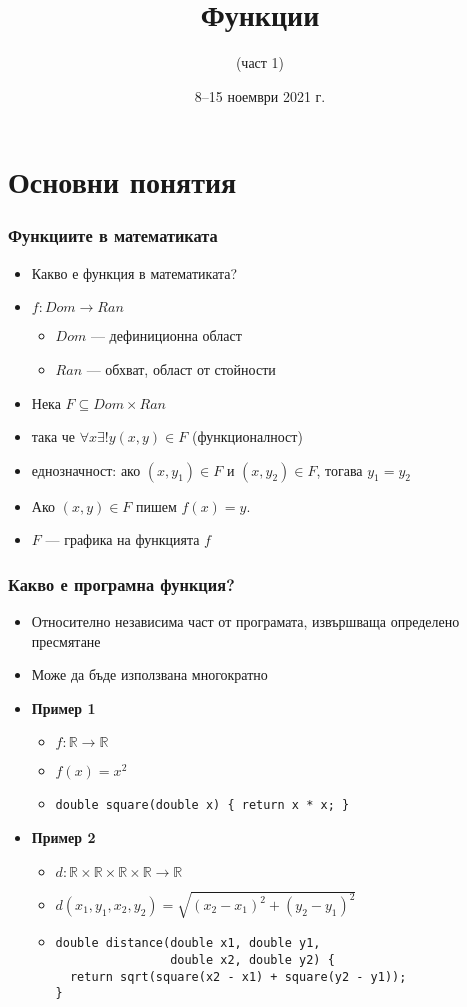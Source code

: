 \documentclass[alsotrans]{beamerswitch}
\title{Функции}
\subtitle{(част 1)}
\date{8--15 ноември 2021 г.}
\newcommand{\RR}{\mathbb{R}}
\begin{document}
\begin{frame}
  \titlepage
\end{frame}

\section{Основни понятия}

\begin{frame}
  \frametitle{Функциите в математиката}

  \begin{itemize}[<+->]
  \item Какво е функция в математиката?
  \item $f : Dom \to Ran$
    \begin{itemize}
    \item $Dom$ --- дефиниционна област
    \item $Ran$ --- обхват, област от стойности
    \end{itemize}
  \item Нека $F \subseteq Dom \times Ran$
  \item така че $\forall x \exists ! y (x,y) \in F$ (функционалност)
  \item еднозначност: ако $(x,y_1) \in F$ и $(x,y_2) \in F$, тогава $y_1 = y_2$
  \item Ако $(x,y)\in F$ пишем $f(x) = y$.
  \item $F$ --- графика на функцията $f$
  \end{itemize}
\end{frame}

\begin{frame}[fragile]
  \frametitle{Какво е програмна функция?}

  \begin{itemize}[<+->]
  \item Относително независима част от програмата, извършваща определено пресмятане
  \item Може да бъде използвана многократно
  \item \textbf{Пример 1}
    \begin{itemize}
    \item $f:\RR \to \RR$
    \item $f(x) = x^2$
    \item \lstinline!double square(double x) { return x * x; }!
    \end{itemize}
  \item \textbf{Пример 2}
    \begin{itemize}
    \item $d:\RR\times\RR\times\RR\times\RR \to \RR$
    \item $d(x_1,y_1,x_2,y_2) = \sqrt{(x_2-x_1)^2 + (y_2-y_1)^2}$
    \item
\begin{lstlisting}
double distance(double x1, double y1,
                double x2, double y2) {
  return sqrt(square(x2 - x1) + square(y2 - y1));
}
\end{lstlisting}
    \end{itemize}
  \end{itemize}
\end{frame}
\end{document}
